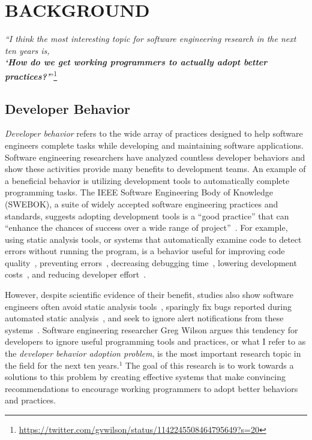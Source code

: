 \chapter{BACKGROUND}
\label{chap-bg}

\begin{center}
\textit{``I think the most interesting topic for software engineering research in the next ten years is, \\\textbf{`How do we get working programmers to actually adopt better practices?'}}''\footnote{\url{https://twitter.com/gvwilson/status/1142245508464795649?s=20}}
\end{center}

\section{Developer Behavior}


 \textit{Developer behavior} refers to the wide array of practices designed to help software engineers complete tasks while developing and maintaining software applications. Software engineering researchers have analyzed countless developer behaviors and show these activities provide many benefits to development teams. An example of a beneficial behavior is utilizing development tools to automatically complete programming tasks. The IEEE Software Engineering Body of Knowledge (SWEBOK), a suite of widely accepted software engineering practices and standards, suggests adopting development tools is a ``good practice'' that can ``enhance the chances of success over a wide range of project''~\citep[p.~A-4]{SWEBOK}. For example, using static analysis tools, or systems that automatically examine code to detect errors without running the program, is a behavior useful for improving code quality~\cite{GoogleFixit}, preventing errors~\cite{bessey2010few}, decreasing debugging time~\cite{Williams2007FaultFixTime}, lowering development costs~\cite{GouesGenProg}, and reducing developer effort~\cite{singh2017staticreview}. 
 
 However, despite scientific evidence of their benefit, studies also show software engineers often avoid static analysis tools~\cite{Johnson2013Why}, sparingly fix bugs reported during automated static analysis~\cite{marcilio2019static}, and seek to ignore alert notifications from these systems~\cite{nasif2019challenges}. Software engineering researcher Greg Wilson argues this tendency for developers to ignore useful programming tools and practices, or what I refer to as the \textit{developer behavior adoption problem}, is the most important research topic in the field for the next ten years.$^1$ The goal of this research is to work towards a solutions to this problem by creating effective systems that make convincing recommendations to encourage working programmers to adopt better behaviors and practices.

